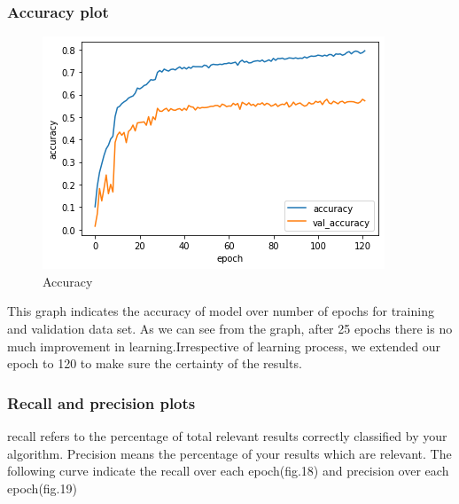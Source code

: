 \documentclass[a4paper,19pt]{article}
\begin{document}
\subsubsection{Accuracy plot}

\begin{figure}[h!]
\centering
\includegraphics[scale=0.7]{images/acc.png}
\caption{Accuracy}
\label{fig:Accuracy}
\end{figure}

This graph indicates the accuracy of model over number of epochs for training and validation data set. As we can see from the graph, after 25 epochs there is no much improvement in learning.Irrespective of learning process, we extended our epoch to 120 to make sure the certainty of the results.


\subsubsection{Recall and precision plots}
recall refers to the percentage of total relevant results correctly classified by your algorithm. Precision means the percentage of your results which are relevant.
The following curve indicate the recall over each epoch(fig.18) and precision over each epoch(fig.19)
\end{document}
